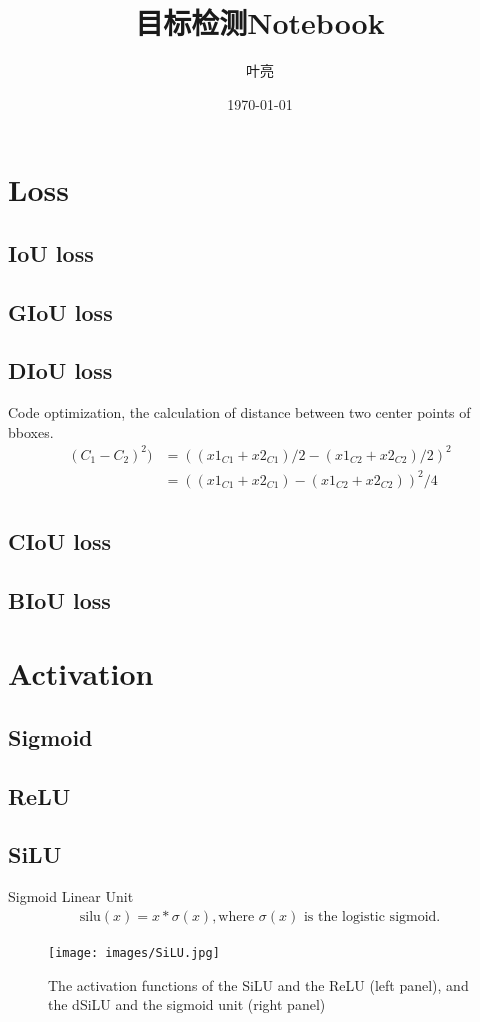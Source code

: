 \documentclass{article}
\title{目标检测Notebook}
\author{叶亮}
\date{\today}
\begin{document}
 
\maketitle
\section{Loss}
\subsection{IoU loss}


\subsection{GIoU loss}

\subsection{DIoU loss}

Code optimization, the calculation of distance between two center points of bboxes.
\begin{equation}
\begin{aligned}
(C_1-C_2)^2)&= ((x1_{C1}+x2_{C1})/2-(x1_{C2}+x2_{C2})/2)^2 \\
&=((x1_{C1}+x2_{C1})-(x1_{C2}+x2_{C2}))^2/4 \\
\end{aligned}
\end{equation}
\subsection{CIoU loss}
\subsection{BIoU loss}

\section{Activation}
\subsection{Sigmoid}

\subsection{ReLU}

\subsection{SiLU}
Sigmoid Linear Unit
\begin{align}
\text{silu}(x) = x * \sigma(x), \text{where } \sigma(x) \text{ is the logistic sigmoid.}
\end{align}
\begin{figure}[htp]
\centering
\texttt{[image: images/SiLU.jpg]}
\caption{The activation functions of the SiLU and the ReLU (left panel), and the dSiLU and the sigmoid unit (right panel)}
\label{SiLU}
\end{figure}
\end{document}
